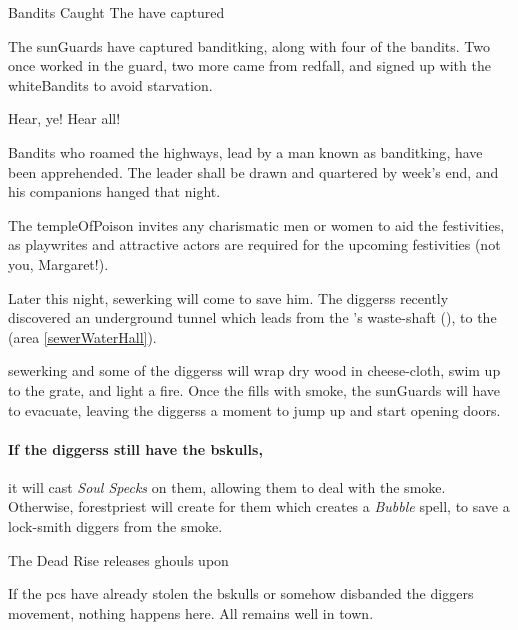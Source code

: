 {Bandits Caught}%
{The  have captured }%

\label{banditsCaught}

The \glspl{sunGuard} have captured \gls{banditking}, along with four of the bandits.
Two once worked in the \gls{guard}, two more came from \gls{redfall}, and signed up with the \gls{whiteBandits} to avoid starvation.

\begin{speechtext}
  Hear, ye!  Hear all!

  Bandits who roamed the highways, lead by a man known as \gls{banditking}, have been apprehended.  The leader shall be drawn and quartered by week's end, and his companions hanged that night.

  The \gls{templeOfPoison} invites any charismatic men or women to aid the festivities, as playwrites and attractive actors are required for the upcoming festivities (not you, Margaret!).
\end{speechtext}


Later this night, \gls{sewerking} will come to save him.
The \glspl{diggers} recently discovered an underground tunnel which leads from the 's waste-shaft (), to the  (area \vref{sewerWaterHall}).

\Gls{sewerking} and some of the \glspl{diggers} will wrap dry wood in cheese-cloth, swim up to the grate, and light a fire.
Once the  fills with smoke, the \glspl{sunGuard} will have to evacuate, leaving the \glspl{diggers} a moment to jump up and start opening doors.

\paragraph{If the \glspl{diggers} still have the \gls{bskulls},}
it will cast \textit{Soul Specks} on them, allowing them to deal with the smoke.
Otherwise, \gls{forestpriest} will create  for them which creates a \textit{Bubble} spell, to save a lock-smith \gls{diggers} from the smoke.

{The Dead Rise}%
{ releases ghouls upon }%

If the \glspl{pc} have already stolen the \gls{bskulls} or somehow disbanded the \gls{diggers} movement, nothing happens here.
All remains well in \gls{town}.

